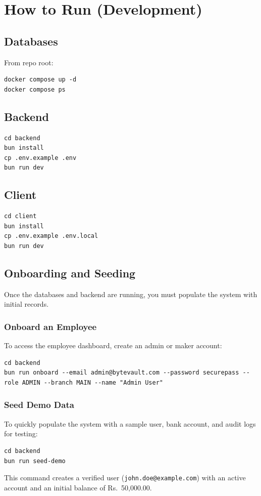 \section{How to Run (Development)}
\subsection{Databases}
From repo root:
\begin{lstlisting}[style=bash]
docker compose up -d
docker compose ps
\end{lstlisting}

\subsection{Backend}
\begin{lstlisting}[style=bash]
cd backend
bun install
cp .env.example .env
bun run dev
\end{lstlisting}

\subsection{Client}
\begin{lstlisting}[style=bash]
cd client
bun install
cp .env.example .env.local
bun run dev
\end{lstlisting}
\subsection{Onboarding and Seeding}
Once the databases and backend are running, you must populate the system with initial records.

\subsubsection{Onboard an Employee}
To access the employee dashboard, create an admin or maker account:
\begin{lstlisting}[style=bash]
cd backend
bun run onboard --email admin@bytevault.com --password securepass --role ADMIN --branch MAIN --name "Admin User"
\end{lstlisting}

\subsubsection{Seed Demo Data}
To quickly populate the system with a sample user, bank account, and audit logs for testing:
\begin{lstlisting}[style=bash]
cd backend
bun run seed-demo
\end{lstlisting}
This command creates a verified user (\texttt{john.doe@example.com}) with an active account and an initial balance of Rs.~50,000.00.
